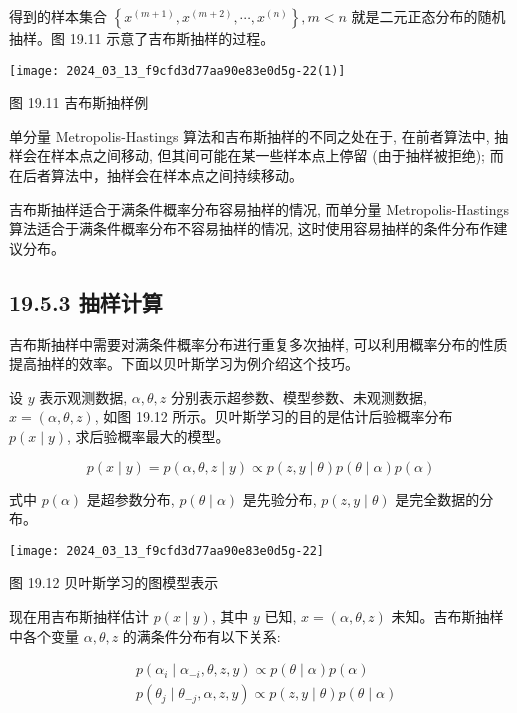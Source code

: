 \documentclass[10pt]{article}
\begin{document}
\begin{CJK*}{UTF8}{bsmi}
得到的样本集合 $\left\{x^{(m+1)}, x^{(m+2)}, \cdots, x^{(n)}\right\}, m<n$ 就是二元正态分布的随机抽样。图 19.11 示意了吉布斯抽样的过程。

\begin{center}
\texttt{[image: 2024\_03\_13\_f9cfd3d77aa90e83e0d5g-22(1)]}
\end{center}

图 19.11 吉布斯抽样例

单分量 Metropolis-Hastings 算法和吉布斯抽样的不同之处在于, 在前者算法中, 抽样会在样本点之间移动, 但其间可能在某一些样本点上停留 (由于抽样被拒绝); 而在后者算法中，抽样会在样本点之间持续移动。

吉布斯抽样适合于满条件概率分布容易抽样的情况, 而单分量 Metropolis-Hastings 算法适合于满条件概率分布不容易抽样的情况, 这时使用容易抽样的条件分布作建议分布。

\subsection*{19.5.3 抽样计算}
吉布斯抽样中需要对满条件概率分布进行重复多次抽样, 可以利用概率分布的性质提高抽样的效率。下面以贝叶斯学习为例介绍这个技巧。

设 $y$ 表示观测数据, $\alpha, \theta, z$ 分别表示超参数、模型参数、未观测数据, $x=(\alpha, \theta, z)$, 如图 19.12 所示。贝叶斯学习的目的是估计后验概率分布 $p(x \mid y)$, 求后验概率最大的模型。


\begin{equation*}
p(x \mid y)=p(\alpha, \theta, z \mid y) \propto p(z, y \mid \theta) p(\theta \mid \alpha) p(\alpha) \tag{19.52}
\end{equation*}


式中 $p(\alpha)$ 是超参数分布, $p(\theta \mid \alpha)$ 是先验分布, $p(z, y \mid \theta)$ 是完全数据的分布。

\begin{center}
\texttt{[image: 2024\_03\_13\_f9cfd3d77aa90e83e0d5g-22]}
\end{center}

图 19.12 贝叶斯学习的图模型表示

现在用吉布斯抽样估计 $p(x \mid y)$, 其中 $y$ 已知, $x=(\alpha, \theta, z)$ 未知。吉布斯抽样中各个变量 $\alpha, \theta, z$ 的满条件分布有以下关系:


\begin{align*}
& p\left(\alpha_{i} \mid \alpha_{-i}, \theta, z, y\right) \propto p(\theta \mid \alpha) p(\alpha)  \tag{19.53}\\
& p\left(\theta_{j} \mid \theta_{-j}, \alpha, z, y\right) \propto p(z, y \mid \theta) p(\theta \mid \alpha) \tag{19.54}
\end{align*}




\end{CJK*}
\end{document}
